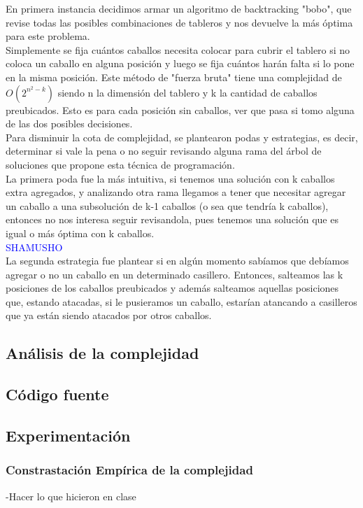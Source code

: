 En primera instancia decidimos armar un algoritmo de backtracking "bobo", que revise todas las posibles combinaciones de tableros y nos devuelve la m\'as \'optima para este problema.\\

Simplemente se fija cu\'antos caballos necesita colocar para cubrir el tablero si no coloca un caballo en alguna posici\'on y luego se fija cu\'antos har\'an falta si lo pone en la misma posici\'on. Este m\'etodo de "fuerza bruta" tiene una complejidad de $O(2^{n^{2} - k})$ siendo n la dimensi\'on del tablero y k la cantidad de caballos preubicados. Esto es para cada posici\'on sin caballos, ver que pasa si tomo alguna de las dos posibles decisiones.\\

Para disminuir la cota de complejidad, se plantearon podas y estrategias, es decir, determinar si vale la pena o no seguir revisando alguna rama del \'arbol de soluciones que propone esta t\'ecnica de programaci\'on.\\

La primera poda fue la m\'as intuitiva, si tenemos una soluci\'on con k caballos extra agregados,  y analizando otra rama llegamos a tener que necesitar agregar un caballo a una subsoluci\'on de k-1 caballos (o sea que tendr\'ia k caballos), entonces no nos interesa seguir revisandola, pues tenemos una soluci\'on que es igual o m\'as \'optima con k caballos.\\

\textcolor{blue}{SHAMUSHO}\\

La segunda estrategia fue plantear si en alg\'un momento sab\'iamos que deb\'iamos agregar o no un caballo en un determinado casillero. Entonces, salteamos las k posiciones de los caballos preubicados y adem\'as salteamos aquellas posiciones que, estando atacadas, si le pusieramos un caballo, estar\'ian atancando a casilleros que ya est\'an siendo atacados por otros caballos.\\

\newpage

\subsection{An\'alisis de la complejidad}
\newpage

\subsection{C\'odigo fuente}
\newpage
\subsection{Experimentaci\'on}

\subsubsection{Constrastaci\'on Emp\'irica de la complejidad}
-Hacer lo que hicieron en clase\\
\newpage
